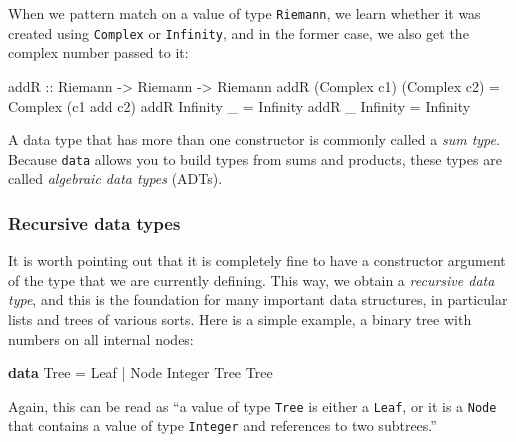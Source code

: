 \documentclass[11pt,
  american,
  DIV13]{article}
\newenvironment{Shaded}{}{}
\newcommand{\DataTypeTok}[1]{\textcolor[rgb]{0.56,0.13,0.00}{#1}}
\newcommand{\KeywordTok}[1]{\textcolor[rgb]{0.00,0.44,0.13}{\textbf{#1}}}
\newcommand{\NormalTok}[1]{#1}
\newcommand{\OperatorTok}[1]{\textcolor[rgb]{0.40,0.40,0.40}{#1}}
\newcommand{\OtherTok}[1]{\textcolor[rgb]{0.00,0.44,0.13}{#1}}
\begin{document}
When we pattern match on a value of type \texttt{Riemann}, we learn
whether it was created using \texttt{Complex} or \texttt{Infinity}, and
in the former case, we also get the complex number passed to it:

\begin{Shaded}
\begin{Highlighting}[]
\OtherTok{addR ::} \DataTypeTok{Riemann} \OtherTok{{-}\textgreater{}} \DataTypeTok{Riemann} \OtherTok{{-}\textgreater{}} \DataTypeTok{Riemann}
\NormalTok{addR (}\DataTypeTok{Complex}\NormalTok{ c1) (}\DataTypeTok{Complex}\NormalTok{ c2) }\OtherTok{=} \DataTypeTok{Complex}\NormalTok{ (c1 }\OtherTok{\textasciigrave{}add\textasciigrave{}}\NormalTok{ c2)}
\NormalTok{addR }\DataTypeTok{Infinity}\NormalTok{ \_  }\OtherTok{=} \DataTypeTok{Infinity}
\NormalTok{addR \_ }\DataTypeTok{Infinity}  \OtherTok{=} \DataTypeTok{Infinity}
\end{Highlighting}
\end{Shaded}

A data type that has more than one constructor is commonly called a
\emph{sum type}. Because \texttt{data} allows you to build types from
sums and products, these types are called \emph{algebraic data types}
(ADTs).

\hypertarget{recursive-data-types}{%
\subsubsection{Recursive data types}\label{recursive-data-types}}

It is worth pointing out that it is completely fine to have a
constructor argument of the type that we are currently defining. This
way, we obtain a \emph{recursive data type}, and this is the foundation
for many important data structures, in particular lists and trees of
various sorts. Here is a simple example, a binary tree with numbers on
all internal nodes:

\begin{Shaded}
\begin{Highlighting}[]
\KeywordTok{data} \DataTypeTok{Tree} \OtherTok{=} \DataTypeTok{Leaf} \OperatorTok{|} \DataTypeTok{Node} \DataTypeTok{Integer} \DataTypeTok{Tree} \DataTypeTok{Tree}
\end{Highlighting}
\end{Shaded}

Again, this can be read as ``a value of type \texttt{Tree} is either a
\texttt{Leaf}, or it is a \texttt{Node} that contains a value of type
\texttt{Integer} and references to two subtrees.''
\end{document}
